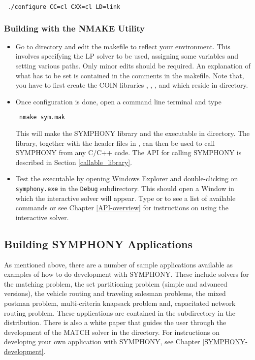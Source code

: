 {\color{Brown}
\begin{verbatim}
 ./configure CC=cl CXX=cl LD=link
\end{verbatim}}

\subsubsection{Building with the NMAKE Utility}
\label{using_nmake}

\begin{itemize}
\item Go to  directory and edit the  
makefile to reflect 
your environment. This involves specifying the LP solver to be used, 
assigning some variables and  setting various paths. Only minor edits 
should be required. An explanation of what has to be set is contained in the 
comments in the makefile.  Note that, you have to first create the COIN 
libraries , , ,  and  
which reside in  directory.

\item Once configuration is done, open a command line terminal and type 
{\color{Brown}
\begin{verbatim}
 nmake sym.mak
\end{verbatim}
}
This will make the SYMPHONY library  and the executable 
 in  directory. The library, together with the 
header files in , can then be used to call 
SYMPHONY from any C/C++ code. The API for calling SYMPHONY is described in 
Section \ref{callable_library}.

\item Test the executable by opening Windows Explorer and double-clicking
on {\color{Brown}\texttt{symphony.exe}} in the
{\color{Brown}\texttt{Debug\bs}} subdirectory. This should open a Window in
which the interactive solver will appear. Type  or  to see
a list of available commands or see Chapter \ref{API-overview} for
instructions on using the interactive solver.

\end{itemize}

\subsection{Building SYMPHONY Applications}
\label{build_appl_msvc}

As mentioned above, there are a number of sample applications available as
examples of how to do development with SYMPHONY. These include solvers for the
matching problem, the set partitioning problem (simple and advanced versions),
the vehicle routing and traveling salesman problems, the mixed postman
problem, multi-criteria knapsack problem and, capacitated network routing
problem. These applications are contained in the 
subdirectory in the distribution. There is also a white paper that guides the
user through the development of the MATCH solver in the 
directory. For instructions on developing your own application with SYMPHONY,
see Chapter \ref{SYMPHONY-development}.


